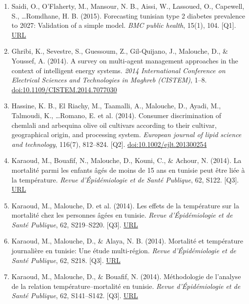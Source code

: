 \documentclass[11pt,a4paper,sans]{moderncv}
\begin{document}
\begin{enumerate}
\item Saidi, O., O'Flaherty, M., Mansour, N. B., Aissi, W., Lassoued, O., Capewell, S., \ldots Romdhane, H. B. (2015). Forecasting tunisian type 2 diabetes prevalence to 2027: Validation of a simple model. \textit{BMC public health}, 15(1), 104. [Q1]. \href{https://bmcpublichealth.biomedcentral.com/articles/10.1186/s12889-015-1416-z}{URL}
\item Ghribi, K., Sevestre, S., Guessoum, Z., Gil-Quĳano, J., Malouche, D., \& Youssef, A. (2014). A survey on multi-agent management approaches in the context of intelligent energy systems. \textit{2014 International Conference on Electrical Sciences and Technologies in Maghreb (CISTEM)}, 1–8. \href{https://doi.org/10.1109/CISTEM.2014.7077030}{doi:10.1109/CISTEM.2014.7077030}
\item Hassine, K. B., El Riachy, M., Taamalli, A., Malouche, D., Ayadi, M., Talmoudi, K., \ldots Romano, E. et al. (2014). Consumer discrimination of chemlali and arbequina olive oil cultivars according to their cultivar, geographical origin, and processing system. \textit{European journal of lipid science and technology}, 116(7), 812–824. [Q2]. \href{https://doi.org/10.1002/ejlt.201300254}{doi:10.1002/ejlt.201300254}
\item Karaoud, M., Bouafif, N., Malouche, D., Kouni, C., \& Achour, N. (2014). La mortalité parmi les enfants âgés de moins de 15 ans en tunisie peut être liée à la température. \textit{Revue d'Épidémiologie et de Santé Publique}, 62, S122. [Q3]. \href{https://www.em-consulte.com/article/911510/article/la-mortalite-parmi-les-enfants-ages-de-moins-de15}{URL}
\item Karaoud, M., Malouche, D. et al. (2014). Les effets de la température sur la mortalité chez les personnes âgées en tunisie. \textit{Revue d'Épidémiologie et de Santé Publique}, 62, S219–S220. [Q3]. \href{https://www.em-consulte.com/article/915656/les-effets-de-la-temperature-sur-la-mortalite-chez}{URL}
\item Karaoud, M., Malouche, D., \& Alaya, N. B. (2014). Mortalité et température journalière en tunisie: Une étude multi-région. \textit{Revue d'Épidémiologie et de Santé Publique}, 62, S218. [Q3]. \href{https://www.em-consulte.com/article/915651/article/mortalite-et-temperature-journaliere-en-tunisie\%C2\%A0-u}{URL}
\item Karaoud, M., Malouche, D., \& Bouafif, N. (2014). Méthodologie de l'analyse de la relation température–mortalité en tunisie. \textit{Revue d'Épidémiologie et de Santé Publique}, 62, S141–S142. [Q3]. \href{https://www.em-consulte.com/article/911552/article/methodologie-de-l-analyse-de-la-relation-temperatu}{URL}

\end{enumerate}
\end{document}
